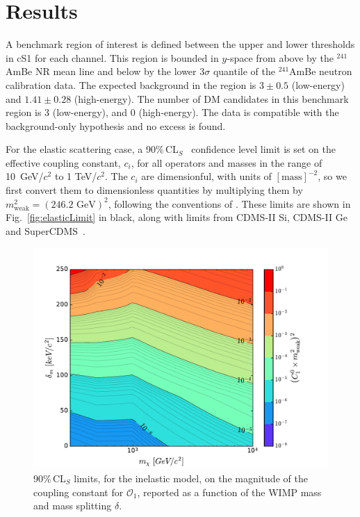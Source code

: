 \section{Results}
\label{sec:Results}

A benchmark region of interest is defined between the upper and lower thresholds in cS1 for each channel. This region
is bounded in $y$-space from above by the $^{241}$AmBe NR mean line and below by the lower 3$\sigma$ quantile of the $^{241}$AmBe neutron calibration data. The expected background in the region is $3 \pm 0.5$ (low-energy) and $1.41 \pm 0.28$ (high-energy). The number of DM candidates in this benchmark region is 3 (low-energy), and 0 (high-energy). The data is compatible with the background-only hypothesis and no excess is found. 

For the elastic scattering case, a 90\%\,CL$_S$~\cite{cls} confidence level limit is set on the effective coupling constant, $c_i$,  for all operators and masses in the range of 10~GeV/$c^2$ to 1 TeV/$c^2$. The $c_i$ are dimensionful, with units of $[\mathrm{mass}]^{-2}$, so we first convert them to dimensionless quantities by multiplying them by $m_\mathrm{weak}^2=(246.2\text{ GeV})^2$, following the conventions of \cite{Anand:MathTools}. 
These limits are shown in Fig.~\ref{fig:elasticLimit} in black, along with limits from CDMS-II Si, CDMS-II Ge and SuperCDMS~\cite{CDMSEFT}.  

\begin{figure}
\centerline{\includegraphics[width=1.\linewidth]{Figures/O1_inelastic_lim_2D}}
\caption{90\%\,CL$_S$ limits, for the inelastic model, on the magnitude of the coupling constant for $\mathcal{O}_1$, reported as a function of the WIMP mass and mass splitting $\delta$.}
\label{fig:O1Inel}
\end{figure}  

